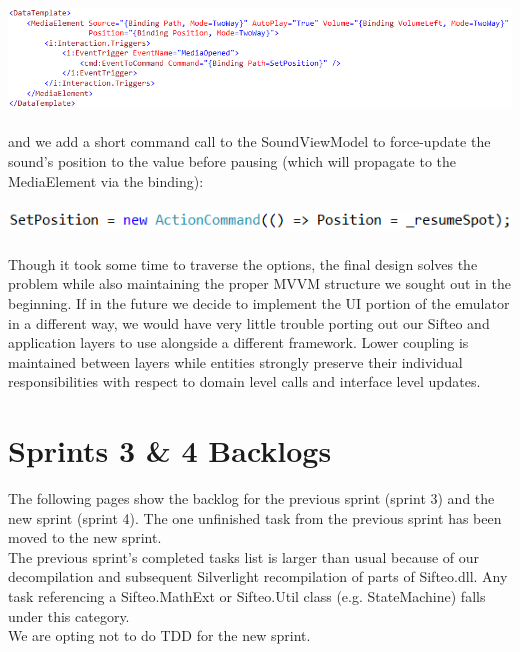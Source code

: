 \documentclass[12pt]{article}
\begin{document}
\includegraphics[scale=.65]{xamlCode.png} \\\\
and we add a short command call to the SoundViewModel to force-update the sound’s position to the value before pausing (which will propagate to the MediaElement via the binding): \\\\
\includegraphics[scale=.65]{commandCode.png} \\\\
Though it took some time to traverse the options, the final design solves the problem while also maintaining the proper MVVM structure we sought out in the beginning. If in the future we decide to implement the UI portion of the emulator in a different way, we would have very little trouble porting out our Sifteo and application layers to use alongside a different framework. Lower coupling is maintained between layers while entities strongly preserve their individual responsibilities with respect to domain level calls and interface level updates.

\section*{Sprints 3 \& 4 Backlogs}
The following pages show the backlog for the previous sprint (sprint 3) and the new sprint (sprint 4). The one unfinished task from the previous sprint has been moved to the new sprint.\\

The previous sprint's completed tasks list is larger than usual because of our decompilation and subsequent Silverlight recompilation of parts of Sifteo.dll. Any task referencing a Sifteo.MathExt or Sifteo.Util class (e.g. StateMachine) falls under this category.\\

We are opting not to do TDD for the new sprint.\\





\clearpage
        
\end{document}
